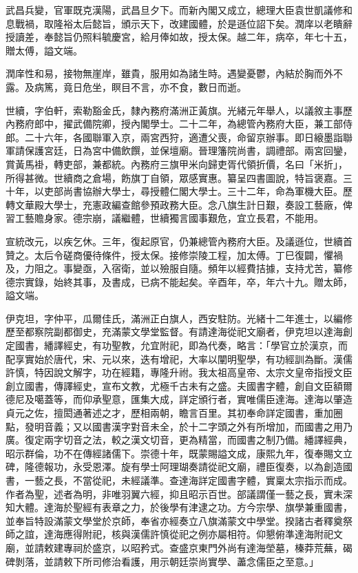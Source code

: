 \begin{pinyinscope}
武昌兵變，官軍既克漢陽，武昌旦夕下。而新內閣又成立，總理大臣袁世凱議修和息戰禍，取隆裕太后懿旨，頒示天下，改建國體，於是遜位詔下矣。潤庠以老瞶辭授讀差，奉懿旨仍照料毓慶宮，給月俸如故，授太保。越二年，病卒，年七十五，贈太傅，謚文端。

潤庠性和易，接物無崖岸，雖貴，服用如為諸生時。遇變憂鬱，內結於胸而外不露。及病篤，竟日危坐，瞑目不言，亦不食，數日而逝。

世續，字伯軒，索勒豁金氏，隸內務府滿洲正黃旗。光緒元年舉人，以議敘主事歷內務府郎中，擢武備院卿，授內閣學士。二十二年，為總管內務府大臣，兼工部侍郎。二十六年，各國聯軍入京，兩宮西狩，適遭父喪，命留京辦事。即日縗墨詣聯軍請保護宮廷，日為宮中備飲饌，並保壇廟。晉理籓院尚書，調禮部。兩宮回鑾，賞黃馬褂，轉吏部，兼都統。內務府三旗甲米向歸吏胥代領折價，名曰「米折」，所得甚微。世續商之倉場，飭旗丁自領，眾感實惠。纂呈四書圖說，特旨褒嘉。三十年，以吏部尚書協辦大學士，尋授體仁閣大學士。三十二年，命為軍機大臣。歷轉文華殿大學士，充憲政編查館參預政務大臣。念八旗生計日艱，奏設工藝廠，俾習工藝贍身家。德宗崩，議繼體，世續獨言國事艱危，宜立長君，不能用。

宣統改元，以疾乞休。三年，復起原官，仍兼總管內務府大臣。及議遜位，世續首贊之。太后令磋商優待條件，授太保。接修崇陵工程，加太傅。丁巳復闢，懼禍及，力阻之。事變亟，入宿衛，並以殮服自隨。頻年以經費拮據，支持尤苦，纂修德宗實錄，始終其事，及書成，已病不能起矣。辛酉年，卒，年六十九。贈太師，謚文端。

伊克坦，字仲平，瓜爾佳氏，滿洲正白旗人，西安駐防。光緒十二年進士，以編修歷至都察院副都御史，充滿蒙文學堂監督。有請達海從祀文廟者，伊克坦以達海創定國書，繙譯經史，有功聖教，允宜附祀，即為代奏，略言：「學官立於漢京，而配享實始於唐代，宋、元以來，迭有增祀，大率以闡明聖學，有功經訓為斷。漢儒許慎，特因說文解字，功在經籍，專隆升祔。我太祖高皇帝、太宗文皇帝指授文臣創立國書，傳譯經史，宣布文教，尤極千古未有之盛。夫國書字體，創自文臣額爾德尼及噶蓋等，而仰承聖意，匯集大成，詳定頒行者，實唯儒臣達海。達海以肇造貞元之佐，擅閎通著述之才，歷相兩朝，瞻言百里。其初奉命詳定國書，重加圈點，發明音義；又以國書漢字對音未全，於十二字頭之外有所增加，而國書之用乃廣。復定兩字切音之法，較之漢文切音，更為精當，而國書之制乃備。繙譯經典，昭示群倫，功不在傳經諸儒下。崇德十年，既蒙賜謚文成，康熙九年，復奉賜文立碑，隆德報功，永受恩澤。旋有學士阿理瑚奏請從祀文廟，禮臣復奏，以為創造國書，一藝之長，不當從祀，未經議準。查達海詳定國書字體，實稟太宗指示而成。作者為聖，述者為明，非唯羽翼六經，抑且昭示百世。部議謂僅一藝之長，實未深知大體。達海於聖經有表章之力，於後學有津逮之功。方今宗學、旗學兼重國書，並奉旨特設滿蒙文學堂於京師，奉省亦經奏立八旗滿蒙文中學堂。揆諸古者釋奠祭師之誼，達海應得附祀，核與漢儒許慎從祀之例亦屬相符。仰懇俯準達海附祀文廟，並請敕建專祠於盛京，以昭矜式。查盛京東門外尚有達海塋墓，榛莽荒蕪，碣碑剝落，並請敕下所司修治看護，用示朝廷崇尚實學、藎念儒臣之至意。」


\end{pinyinscope}
